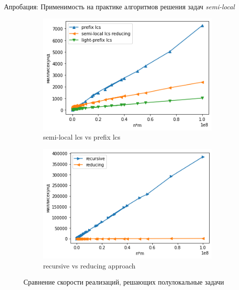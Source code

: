 \documentclass[xcolor=table]{beamer}
\begin{document}
\begin{frame}{Апробация: Применимость на практике алгоритмов решения задач \emph{semi-local}}

\begin{figure}
    \centering
    \begin{subfigure}[b]{0.45\textwidth}
    \centering
    \includegraphics[width=\textwidth]{pictures/semiLocalvsPrefixLCS.png} \caption{semi-local lcs vs prefix lcs}
    \label{fig:subim1}
    \end{subfigure}%
    \begin{subfigure}[b]{0.45\textwidth}
    \centering
    \includegraphics[width=\textwidth]{pictures/semilocalReducignVssemiLocalRecursive.png}
    \caption{recursive vs reducing approach}
    \label{fig:subim2}
    \end{subfigure}
\caption{Сравнение скорости реализаций, решающих полулокальные задачи}
\end{figure}


\end{frame}
\end{document}
